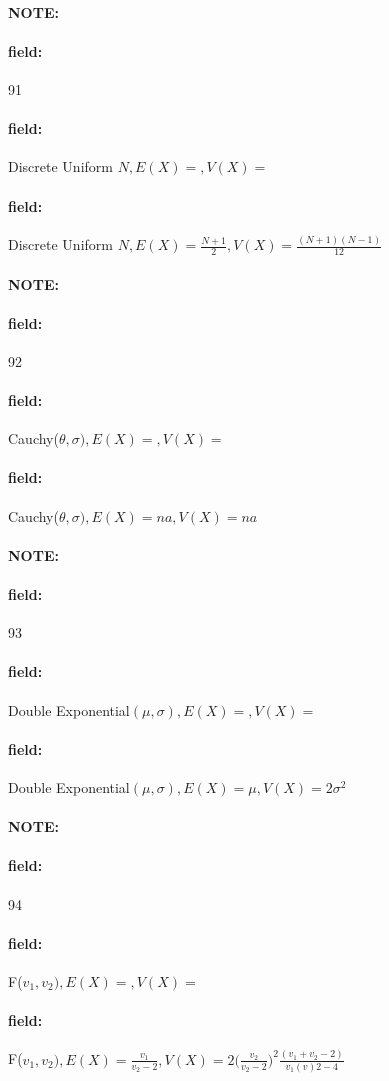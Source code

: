 \documentclass[12pt]{article}
\newenvironment{note}{\paragraph{NOTE:}}{}
\newenvironment{field}{\paragraph{field:}}{}
\begin{document}
\begin{note} \begin{field} \tiny 91 \end{field}
  \begin{field}
    Discrete Uniform $N, E(X) = , V(X) = $
  \end{field}
  \begin{field}
    Discrete Uniform $N, E(X) = \frac{N+1}{2}, V(X) = \frac{(N+1)(N-1)}{12}$
  \end{field}
\end{note}

\begin{note} \begin{field} \tiny 92 \end{field}
  \begin{field}
    Cauchy($\theta,\sigma), E(X) = ,V(X)=$
  \end{field}
  \begin{field}
    Cauchy($\theta,\sigma), E(X) = na,V(X)=na$
  \end{field}
\end{note}

\begin{note} \begin{field} \tiny 93 \end{field}
  \begin{field}
    Double Exponential$(\mu,\sigma), E(X) = , V(X) = $
  \end{field}
  \begin{field}
    Double Exponential$(\mu,\sigma), E(X) = \mu, V(X) = 2\sigma^2$
  \end{field}
\end{note}

\begin{note} \begin{field} \tiny 94 \end{field}
  \begin{field}
    F($v_1,v_2), E(X) = , V(X) = $
  \end{field}
  \begin{field}
F($v_1,v_2), E(X) = \frac{v_1}{v_2-2}, V(X) = 2\big(\frac{v_2}{v_2-2}\big)^2\frac{(v_1+v_2-2)}{v_1(v)2-4}$
  \end{field}
\end{note}
\end{document}
